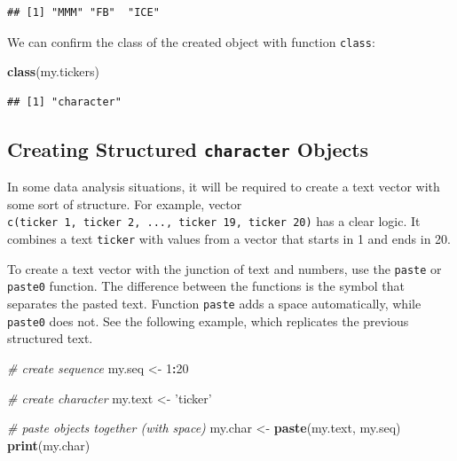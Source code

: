 \documentclass[11pt,]{book}
\newenvironment{Shaded}{\begin{snugshade}}{\end{snugshade}}
\newcommand{\KeywordTok}[1]{\textcolor[rgb]{0.27,0.27,0.27}{\textbf{#1}}}
\newcommand{\DecValTok}[1]{\textcolor[rgb]{0.06,0.06,0.06}{#1}}
\newcommand{\StringTok}[1]{\textcolor[rgb]{0.5,0.5,0.5}{#1}}
\newcommand{\CommentTok}[1]{\textcolor[rgb]{0.56,0.35,0.01}{\textit{#1}}}
\newcommand{\OperatorTok}[1]{\textcolor[rgb]{0.81,0.36,0.00}{\textbf{#1}}}
\newcommand{\NormalTok}[1]{#1}
\begin{document}
\begin{verbatim}
## [1] "MMM" "FB"  "ICE"
\end{verbatim}

We can confirm the class of the created object with function
\texttt{class}: 

\begin{Shaded}
\begin{Highlighting}[]
\KeywordTok{class}\NormalTok{(my.tickers)}
\end{Highlighting}
\end{Shaded}

\begin{verbatim}
## [1] "character"
\end{verbatim}

\subsection{\texorpdfstring{Creating Structured \texttt{character}
Objects}{Creating Structured character Objects}}\label{creating-structured-character-objects}

In some data analysis situations, it will be required to create a text
vector with some sort of structure. For example, vector
\texttt{c(\textquotesingle{}ticker\ 1\textquotesingle{},\ \textquotesingle{}ticker\ 2\textquotesingle{},\ ...,\ \textquotesingle{}ticker\ 19\textquotesingle{},\ \textquotesingle{}ticker\ 20\textquotesingle{})}
has a clear logic. It combines a text \texttt{ticker} with values from a
vector that starts in 1 and ends in 20.

To create a text vector with the junction of text and numbers, use the
\texttt{paste} or \texttt{paste0} function. The difference between the
functions is the symbol that separates the pasted text. Function
\texttt{paste} adds a space automatically, while \texttt{paste0} does
not. See the following example, which replicates the previous structured
text.  

\begin{Shaded}
\begin{Highlighting}[]
\CommentTok{# create sequence}
\NormalTok{my.seq <-}\StringTok{ }\DecValTok{1}\OperatorTok{:}\DecValTok{20}

\CommentTok{# create character}
\NormalTok{my.text <-}\StringTok{ 'ticker'}

\CommentTok{# paste objects together (with space)}
\NormalTok{my.char <-}\StringTok{ }\KeywordTok{paste}\NormalTok{(my.text, my.seq)}
\KeywordTok{print}\NormalTok{(my.char)}
\end{Highlighting}
\end{Shaded}
\end{document}
